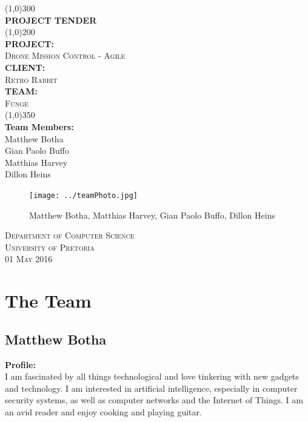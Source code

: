 \documentclass{article}
\begin{document}
\begin{titlepage}
	\begin{center}
		\line(1,0){300}\\
		[6mm]
		\huge{\bfseries PROJECT TENDER}\\
		[2mm]
		\line(1,0){200}\\
		[5mm]
		\large\textbf{PROJECT:}\\\textsc{Drone Mission Control - Agile}\\
		[3mm]
		\large\textbf{CLIENT:}\\\textsc{Retro Rabbit}\\
		[3mm]
		\large \textbf{TEAM:}\\\textsc{Funge}\\
		\line(1,0){350}\\
		[5mm]
		\large \textbf{Team Members:}\\
		[3mm]
		\large Matthew Botha\\
		\large Gian Paolo Buffo\\
		\large Matthias Harvey\\
        \large Dillon Heins\\[3mm]
		\begin{figure}[H]
			\centering
			\texttt{[image: ../teamPhoto.jpg]}
			\caption{Matthew Botha, Matthias Harvey, Gian Paolo Buffo, Dillon Heins}
		\end{figure}
    \end{center}

	\vspace{7mm}

    \begin{flushright}
        \textsc{\large Department of Computer Science\\
        University of Pretoria\\
        01 May 2016\\}
    \end{flushright}
\end{titlepage}

\section{The Team}
\subsection{Matthew Botha}
\textbf{Profile:}\\
I am fascinated by all things technological and love tinkering with new gadgets and technology. I am interested in artificial intelligence, especially in computer security systems, as well as computer networks and the Internet of Things. I am an avid reader and enjoy cooking and playing guitar.
\end{document}
